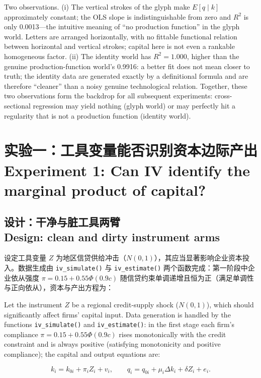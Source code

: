 \documentclass[12pt,a4paper]{ctexart}
\begin{document}
Two observations. (i) The vertical strokes of the glyph make $E[q\mid k]$ approximately constant; the OLS slope is indistinguishable from zero and $R^2$ is only 0.0013—the intuitive meaning of “no production function” in the glyph world. Letters are arranged horizontally, with no fittable functional relation between horizontal and vertical strokes; capital here is not even a rankable homogeneous factor. (ii) The identity world has $R^2=1.000$, higher than the genuine production-function world's 0.9916: a better fit does not mean closer to truth; the identity data are generated exactly by a definitional formula and are therefore “cleaner” than a noisy genuine technological relation. Together, these two observations form the backdrop for all subsequent experiments: cross-sectional regression may yield nothing (glyph world) or may perfectly hit a regularity that is not a production function (identity world).

\section[实验一：工具变量]{实验一：工具变量能否识别资本边际产出\\[2pt]\normalsize Experiment 1: Can IV identify the marginal product of capital?}

\subsection[设计]{设计：干净与脏工具两臂\\[1pt]\normalsize Design: clean and dirty instrument arms}

设定工具变量 $Z$ 为地区信贷供给冲击（$N(0,1)$），其应当显著影响企业资本投入。数据生成由 \texttt{iv\_simulate()} 与 \texttt{iv\_estimate()} 两个函数完成：第一阶段中企业依从强度 $\pi = 0.15 + 0.55\Phi(0.9c)$ 随信贷约束单调递增且恒为正（满足单调性与正向依从），资本与产出方程为：

Let the instrument $Z$ be a regional credit-supply shock ($N(0,1)$), which should significantly affect firms' capital input. Data generation is handled by the functions \texttt{iv\_simulate()} and \texttt{iv\_estimate()}: in the first stage each firm's compliance $\pi=0.15+0.55\Phi(0.9c)$ rises monotonically with the credit constraint and is always positive (satisfying monotonicity and positive compliance); the capital and output equations are:

\begin{equation}\label{eq:iv}
k_i = k_{0i} + \pi_i Z_i + v_i, \qquad
q_i = q_{0i} + \mu_i \Delta k_i + \delta Z_i + e_i .
\end{equation}
\end{document}
